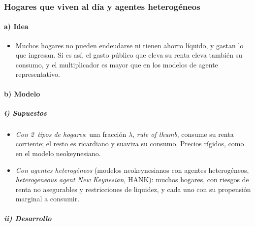 \documentclass[11pt]{article}
\begin{document}
\subsubsection{Hogares que viven al día y agentes heterogéneos}\label{sec:hank}

\paragraph{a) Idea}

\begin{itemize}
\item Muchos hogares no pueden endeudarse ni tienen ahorro líquido, y gastan lo que ingresan. Si es así, el gasto público que eleva su renta eleva también su consumo, y el multiplicador es mayor que en los modelos de agente representativo.
\end{itemize}

\paragraph{b) Modelo}

\subparagraph{i) Supuestos}

\begin{itemize}
\item \emph{Con 2~tipos de hogares}\nocite{GaliLopezSalidoValles2007}: una fracción $\lambda$, \emph{rule of thumb}, consume su renta corriente; el resto es ricardiano y suaviza su consumo. Precios rígidos, como en el modelo neokeynesiano.
\item \emph{Con agentes heterogéneos} (modelos neokeynesianos con agentes heterogéneos, \emph{heterogeneous agent New Keynesian}, HANK): muchos hogares, con riesgos de renta no asegurables y restricciones de liquidez, y cada uno con su propensión marginal a consumir.
\end{itemize}

\subparagraph{ii) Desarrollo}
\end{document}
